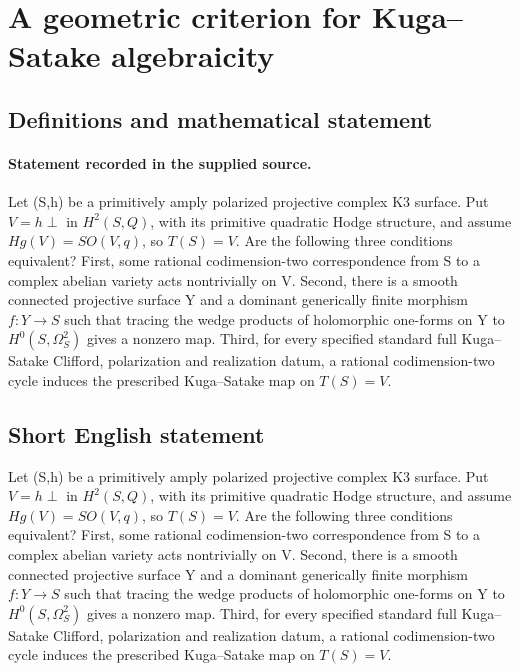 \documentclass[11pt]{article}
\begin{document}
\section*{A geometric criterion for Kuga–Satake algebraicity}\label{statement}
\subsection{Definitions and mathematical statement}
\paragraph{Statement recorded in the supplied source.}
Let (S,h) be a primitively amply polarized projective complex K3 surface. Put $V=h\perp $ in $H^{2}(S,Q)$, with its primitive quadratic Hodge structure, and assume $Hg(V)=SO(V,q)$, so $T(S)=V$. Are the following three conditions equivalent? First, some rational codimension-two correspondence from S to a complex abelian variety acts nontrivially on V. Second, there is a smooth connected projective surface Y and a dominant generically finite morphism $f:Y\to S$ such that tracing the wedge products of holomorphic one-forms on Y to $H^{0}(S,\Omega ^{2}_S)$ gives a nonzero map. Third, for every specified standard full Kuga–Satake Clifford, polarization and realization datum, a rational codimension-two cycle induces the prescribed Kuga–Satake map on $T(S)=V$.
\subsection{Short English statement}
Let (S,h) be a primitively amply polarized projective complex K3 surface. Put $V=h\perp $ in $H^{2}(S,Q)$, with its primitive quadratic Hodge structure, and assume $Hg(V)=SO(V,q)$, so $T(S)=V$. Are the following three conditions equivalent? First, some rational codimension-two correspondence from S to a complex abelian variety acts nontrivially on V. Second, there is a smooth connected projective surface Y and a dominant generically finite morphism $f:Y\to S$ such that tracing the wedge products of holomorphic one-forms on Y to $H^{0}(S,\Omega ^{2}_S)$ gives a nonzero map. Third, for every specified standard full Kuga–Satake Clifford, polarization and realization datum, a rational codimension-two cycle induces the prescribed Kuga–Satake map on $T(S)=V$.
\end{document}
